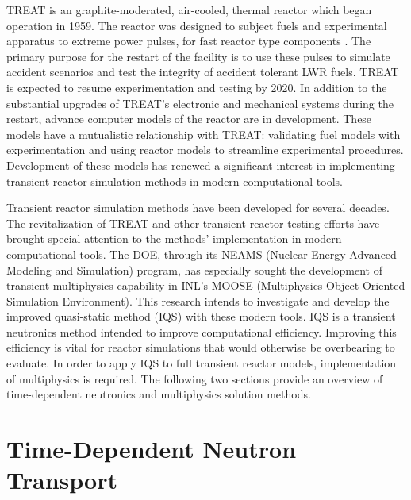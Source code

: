 TREAT is an graphite-moderated, air-cooled, thermal reactor which began operation in 1959.  The reactor was designed to subject fuels and experimental apparatus to extreme power pulses, for fast reactor type components \cite{TREATSummary}. The primary purpose for the restart of the facility is to use these pulses to simulate accident scenarios and test the integrity of accident tolerant LWR fuels. TREAT is expected to resume experimentation and testing by 2020.  In addition to the substantial upgrades of TREAT's electronic and mechanical systems during the restart, advance computer models of the reactor are in development.  These models have a mutualistic relationship with TREAT: validating fuel models with experimentation and using reactor models to streamline experimental procedures. Development of these models has renewed a significant interest in implementing transient reactor simulation methods in modern computational tools.

Transient reactor simulation methods have been developed for several decades. The revitalization of TREAT and other transient reactor testing efforts have brought special attention to the methods' implementation in modern computational tools.  The DOE, through its NEAMS (Nuclear Energy Advanced Modeling and Simulation) program, has especially sought the development of transient multiphysics capability in INL's MOOSE (Multiphysics Object-Oriented Simulation Environment). This research intends to investigate and develop the improved quasi-static method (IQS) with these modern tools. IQS is a transient neutronics method intended to improve computational efficiency. Improving this efficiency is vital for reactor simulations that would otherwise be overbearing to evaluate. In order to apply IQS to full transient reactor models, implementation of multiphysics is required. The following two sections provide an overview of time-dependent neutronics and multiphysics solution methods. 

\section{Time-Dependent Neutron Transport}

